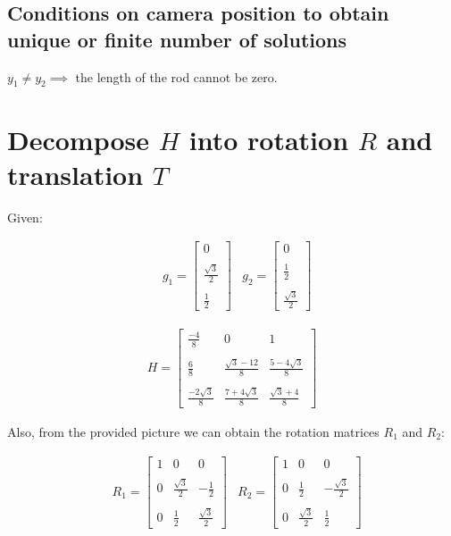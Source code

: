 \documentclass[12pt, oneside]{article}
\begin{document}
\subsection{Conditions on camera position to obtain unique or finite number 
of solutions}
$y_1 \neq y_2 \implies$ the length of the rod cannot be zero.

\clearpage
\section{Decompose $H$ into rotation $R$ and translation $T$}

Given:

\begin{align*}
    & g_1 =  
    \begin{bmatrix} 0 \\ \\ \frac{\sqrt{3}}{2} \\ \\ \frac{1}{2} \end{bmatrix} 
    & g_2 =  
    \begin{bmatrix} 0 \\ \\ \frac{1}{2} \\ \\ \frac{\sqrt{3}}{2} \end{bmatrix} 
\end{align*}

\begin{align*}
    H =  
    \begin{bmatrix} \frac{-4}{8} & 0 & 1 \\ \\ 
                    \frac{6}{8} & \frac{\sqrt{3} - 12}{8} 
                    & \frac{5 -4\sqrt{3}}{8}    \\ \\ 
                    \frac{-2 \sqrt{3}}{8} & 
                    \frac{7 + 4\sqrt{3}}{8} & \frac{\sqrt{3} + 4}{8} 
                \end{bmatrix} 
\end{align*}

Also, from the provided picture we can obtain the rotation matrices $R_1$ and 
$R_2$:

\begin{align*}
    & R_1 =  
    \begin{bmatrix} 1 & 0 & 0 \\ \\ 
                    0 & \frac{\sqrt{3}}{2} & -\frac{1}{2}\\ \\ 
                    0 & \frac{1}{2} & \frac{\sqrt{3}}{2} \end{bmatrix} 
    & R_2 =  
    \begin{bmatrix} 1 & 0 & 0 \\ \\ 
                    0 & \frac{1}{2} & -\frac{\sqrt{3}}{2}\\ \\ 
                    0 & \frac{\sqrt{3}}{2} & \frac{1}{2} \end{bmatrix} 
\end{align*}
\end{document}
